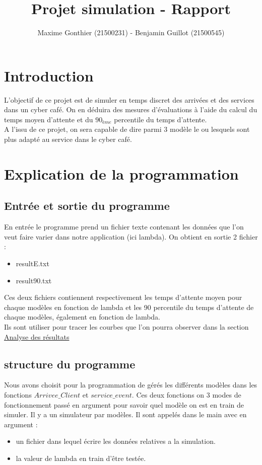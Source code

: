 \documentclass[a4paper,11pt]{article}
\title{Projet simulation - Rapport}
\author{Maxime Gonthier (21500231) - Benjamin Guillot (21500545)}
\begin{document}
\clearpage
\maketitle

\newpage
\tableofcontents

\newpage
\section{Introduction}
	L'objectif de ce projet est de simuler en temps discret des arrivées et des services dans un cyber café. On en déduira des mesures d'évaluations à l'aide du calcul du temps moyen d'attente et du $90_{ème}$ percentile du temps d'attente.\\
	A l'issu de ce projet, on sera capable de dire parmi 3 modèle le ou lesquels sont plus adapté au service dans le cyber café.
\newpage
\section{Explication de la programmation}
	\subsection{Entrée et sortie du programme}
	En entrée le programme prend un fichier texte contenant les données que l'on veut faire varier dans notre application (ici lambda).
	On obtient en sortie 2 fichier :
	\begin{itemize}
		\item resultE.txt
		\item result90.txt
	\end{itemize}
	Ces deux fichiers contiennent respectivement les temps d'attente moyen pour chaque modèles en fonction de lambda et les 90 percentile du temps d'attente de chaque modèles, également en fonction de lambda.\\
	Ils sont utiliser pour tracer les courbes que l'on pourra observer dans la section \hyperref[Analyse des résultats]{Analyse des résultats}
	\subsection{structure du programme}
	Nous avons choisit pour la programmation de gérés les différents modèles dans les fonctions $Arrivee\_Client$ et $service\_event$. Ces deux fonctions on 3 modes de fonctionnement
	passé en argument pour savoir quel modèle on est en train de simuler. Il y a un simulateur par modèles.
	Il sont appelés dans le main avec en argument :
	\begin{itemize}
		\item un fichier dans lequel écrire les données relatives a la simulation.
		\item la valeur de lambda en train d'être testée.
	\end{itemize}
\end{document}
